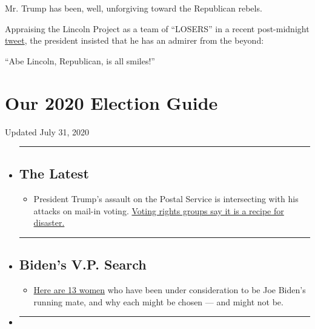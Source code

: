 Mr. Trump has been, well, unforgiving toward the Republican rebels.

Appraising the Lincoln Project as a team of ``LOSERS'' in a recent
post-midnight
\href{https://twitter.com/realDonaldTrump/status/1257532114666508291}{tweet},
the president insisted that he has an admirer from the beyond:

``Abe Lincoln, Republican, is all smiles!''

\hypertarget{our-2020-election-guide}{%
\section{Our 2020 Election Guide}\label{our-2020-election-guide}}

Updated July 31, 2020

\begin{itemize}
\item
  \begin{center}\rule{0.5\linewidth}{\linethickness}\end{center}

  \hypertarget{the-latest}{%
  \subsection{The Latest}\label{the-latest}}

  \begin{itemize}
  \tightlist
  \item
    President Trump's assault on the Postal Service is intersecting with
    his attacks on mail-in voting.
    \href{https://www.nytimes.com/2020/07/31/us/politics/trump-usps-mail-delays.html?action=click\&pgtype=Article\&state=default\&region=BELOW_MAIN_CONTENT\&context=storylines_guide}{Voting
    rights groups say it is a recipe for disaster.}
  \end{itemize}
\item
  \begin{center}\rule{0.5\linewidth}{\linethickness}\end{center}

  \hypertarget{bidens-vp-search}{%
  \subsection{Biden's V.P. Search}\label{bidens-vp-search}}

  \begin{itemize}
  \tightlist
  \item
    \href{https://www.nytimes.com/article/biden-vice-president-2020.html?action=click\&pgtype=Article\&state=default\&region=BELOW_MAIN_CONTENT\&context=storylines_guide}{Here
    are 13 women} who have been under consideration to be Joe Biden's
    running mate, and why each might be chosen --- and might not be.
  \end{itemize}
\item
  \begin{center}\rule{0.5\linewidth}{\linethickness}\end{center}


\end{itemize}
